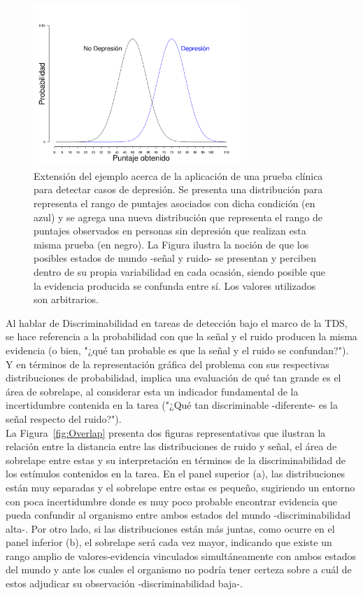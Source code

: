 \begin{figure}[th]
\centering
\includegraphics[width=0.70\textwidth]{Figures/Noise} 
\caption[Variabilidad en la señal y en el ruido]{Extensión del ejemplo acerca de la aplicación de una prueba clínica para detectar casos de depresión. Se presenta una distribución para representa el rango de puntajes asociados con dicha condición (en azul) y se agrega una nueva distribución que representa el rango de puntajes observados en personas sin depresión que realizan esta misma prueba (en negro). La Figura ilustra la noción de que los posibles estados de mundo -señal y ruido- se presentan y perciben dentro de su propia variabilidad en cada ocasión, siendo posible que la evidencia producida se confunda entre sí. Los valores utilizados son arbitrarios.}
\label{fig:Noise}
\end{figure}

Al hablar de Discriminabilidad en tareas de detección bajo el marco de la TDS, se hace referencia a la probabilidad con que la señal y el ruido producen la misma evidencia (o bien, "¿qué tan probable es que la señal y el ruido se confundan?"). Y en términos de la representación gráfica del problema con sus respectivas distribuciones de probabilidad, implica una evaluación de qué tan grande es el área de sobrelape, al considerar esta un indicador fundamental de la incertidumbre contenida en la tarea ("¿Qué tan discriminable -diferente- es la señal respecto del ruido?").\\

La Figura~\ref{fig:Overlap} presenta dos figuras representativas que ilustran la relación entre la distancia entre las distribuciones de ruido y señal, el área de sobrelape entre estas y su interpretación en términos de la discriminabilidad de los estímulos contenidos en la tarea. En el panel superior (a), las distribuciones están muy separadas y el sobrelape entre estas es pequeño, sugiriendo un entorno con poca incertidumbre donde es muy poco probable encontrar evidencia que pueda confundir al organismo entre ambos estados del mundo -discriminabilidad alta-. Por otro lado, si las distribuciones están más juntas, como ocurre en el panel inferior (b), el sobrelape será cada vez mayor, indicando que existe un rango amplio de valores-evidencia vinculados simultáneamente con ambos estados del mundo y ante los cuales el organismo no podría tener certeza sobre a cuál de estos adjudicar su observación -discriminabilidad baja-.\\

